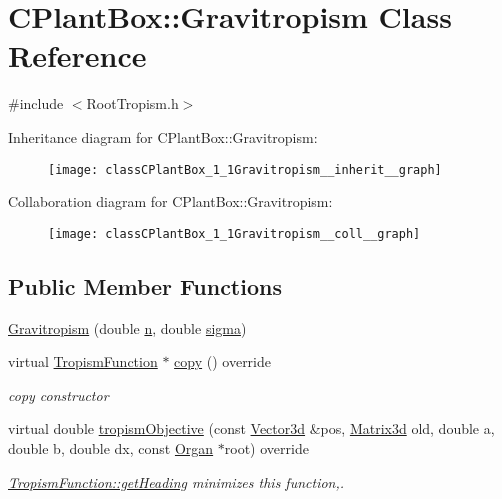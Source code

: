 \hypertarget{classCPlantBox_1_1Gravitropism}{}\section{C\+Plant\+Box\+:\+:Gravitropism Class Reference}
\label{classCPlantBox_1_1Gravitropism}


{\ttfamily \#include $<$Root\+Tropism.\+h$>$}



Inheritance diagram for C\+Plant\+Box\+:\+:Gravitropism\+:\nopagebreak
\begin{figure}[H]
\begin{center}
\leavevmode
\texttt{[image: classCPlantBox\_1\_1Gravitropism\_\_inherit\_\_graph]}
\end{center}
\end{figure}


Collaboration diagram for C\+Plant\+Box\+:\+:Gravitropism\+:\nopagebreak
\begin{figure}[H]
\begin{center}
\leavevmode
\texttt{[image: classCPlantBox\_1\_1Gravitropism\_\_coll\_\_graph]}
\end{center}
\end{figure}
\subsection*{Public Member Functions}
\begin{DoxyCompactItemize}
\item 
\hyperlink{classCPlantBox_1_1Gravitropism_a2a6a57c372c3257e72156160c8fc5e6b}{Gravitropism} (double \hyperlink{classCPlantBox_1_1TropismFunction_a619c74d63319c406730c95679784a04a}{n}, double \hyperlink{classCPlantBox_1_1TropismFunction_acdc5f9c3beda0a74ddadd591c5d8afaf}{sigma})
\item 
\mbox{\label{classCPlantBox_1_1Gravitropism_a210a09ce5911d8e58270e81d3d41a1e3}} 
virtual \hyperlink{classCPlantBox_1_1TropismFunction}{Tropism\+Function} $\ast$ \hyperlink{classCPlantBox_1_1Gravitropism_a210a09ce5911d8e58270e81d3d41a1e3}{copy} () override
\begin{DoxyCompactList}\small\item\em copy constructor \end{DoxyCompactList}\item 
virtual double \hyperlink{classCPlantBox_1_1Gravitropism_a4471a30549db829fe19a91650ca8f87e}{tropism\+Objective} (const \hyperlink{classCPlantBox_1_1Vector3d}{Vector3d} \&pos, \hyperlink{classCPlantBox_1_1Matrix3d}{Matrix3d} old, double a, double b, double dx, const \hyperlink{classCPlantBox_1_1Organ}{Organ} $\ast$root) override
\begin{DoxyCompactList}\small\item\em \hyperlink{classCPlantBox_1_1TropismFunction_adb52b88734a94fe1365a00e02c7e6be5}{Tropism\+Function\+::get\+Heading} minimizes this function,. \end{DoxyCompactList}\end{DoxyCompactItemize}
